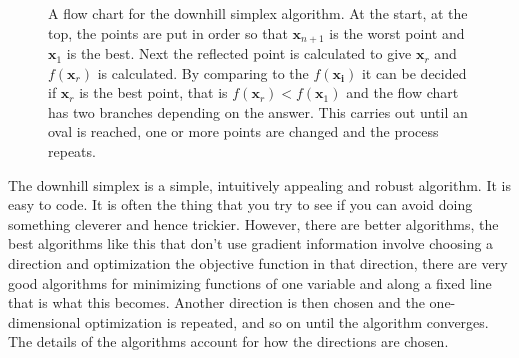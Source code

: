 \documentclass[11pt,a4paper]{scrartcl}
\begin{document}
\begin{figure}
\begin{center}
\end{center}
\caption{A flow chart for the downhill simplex algorithm. At the
  start, at the top, the points are put in order so that
  $\mathbf{x}_{n+1}$ is the worst point and $\mathbf{x}_1$ is the
  best. Next the reflected point is calculated to give $\mathbf{x}_r$
  and $f(\mathbf{x}_r)$ is calculated. By comparing to the
  $f(\mathbf{x_i})$ it can be decided if $\mathbf{x}_r$ is the best
  point, that is $f(\mathbf{x}_r)<f(\mathbf{x}_1)$ and the flow chart
  has two branches depending on the answer. This carries out until an
  oval is reached, one or more points are changed and the process
  repeats.\label{fig:flowchart}}
\end{figure}

The downhill simplex is a simple, intuitively appealing and robust
algorithm. It is easy to code. It is often the thing that you try to
see if you can avoid doing something cleverer and hence
trickier. However, there are better algorithms, the best algorithms
like this that don't use gradient information involve choosing a
direction and optimization the objective function in that direction,
there are very good algorithms for minimizing functions of one
variable and along a fixed line that is what this becomes. Another
direction is then chosen and the one-dimensional optimization is
repeated, and so on until the algorithm converges. The details of the
algorithms account for how the directions are chosen.
\end{document}
